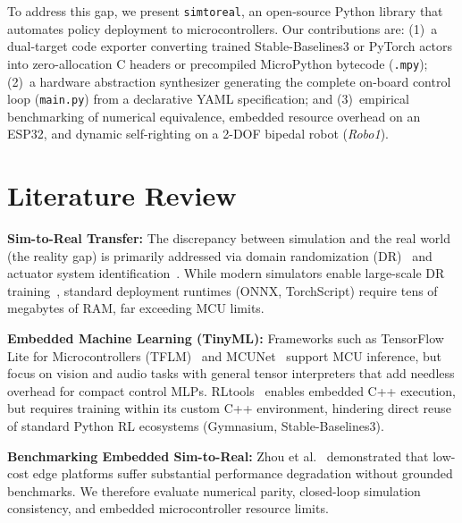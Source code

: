 \documentclass[10pt, conference, a4paper]{IEEEtran}
\begin{document}
To address this gap, we present \texttt{simtoreal}, an open-source Python library that automates policy deployment to microcontrollers. Our contributions are: (1)~a dual-target code exporter converting trained Stable-Baselines3 or PyTorch actors into zero-allocation C headers or precompiled MicroPython bytecode (\texttt{.mpy}); (2)~a hardware abstraction synthesizer generating the complete on-board control loop (\texttt{main.py}) from a declarative YAML specification; and (3)~empirical benchmarking of numerical equivalence, embedded resource overhead on an ESP32, and dynamic self-righting on a 2-DOF bipedal robot (\textit{Robo1}).

\section{Literature Review}
\label{sec:lit_review}

\textbf{Sim-to-Real Transfer:} The discrepancy between simulation and the real world (the reality gap) is primarily addressed via domain randomization (DR)~\cite{tobin2017domain} and actuator system identification~\cite{hwangbo2019learning, tan2018sim}. While modern simulators enable large-scale DR training~\cite{rudin2022advanced, mittal2023orbit}, standard deployment runtimes (ONNX, TorchScript) require tens of megabytes of RAM, far exceeding MCU limits.

\textbf{Embedded Machine Learning (TinyML):} Frameworks such as TensorFlow Lite for Microcontrollers (TFLM)~\cite{david2021tensorflow} and MCUNet~\cite{lin2020mcunet} support MCU inference, but focus on vision and audio tasks with general tensor interpreters that add needless overhead for compact control MLPs. RLtools~\cite{eschmann2023rltools} enables embedded C++ execution, but requires training within its custom C++ environment, hindering direct reuse of standard Python RL ecosystems (Gymnasium, Stable-Baselines3).

\textbf{Benchmarking Embedded Sim-to-Real:} Zhou et al.~\cite{zhou2026measure} demonstrated that low-cost edge platforms suffer substantial performance degradation without grounded benchmarks. We therefore evaluate numerical parity, closed-loop simulation consistency, and embedded microcontroller resource limits.
\end{document}
